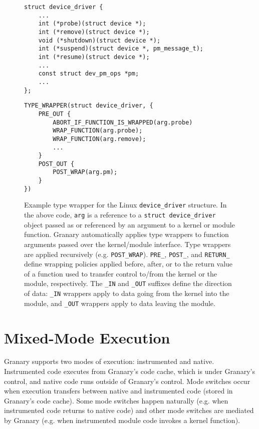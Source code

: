 \documentclass[preprint]{sigplanconf}
\let\ORIGcaption\caption
\begin{document}
\begin{figure*}[t!]
\lstset{language=C, tabsize=2, stepnumber=1}
\begin{multicols}{2}
\begin{lstlisting}[basicstyle=\footnotesize\ttfamily]
struct device_driver {
	...
	int (*probe)(struct device *);
	int (*remove)(struct device *);
	void (*shutdown)(struct device *);
	int (*suspend)(struct device *, pm_message_t);
	int (*resume)(struct device *);
	...
	const struct dev_pm_ops *pm;
	...
};
\end{lstlisting}
\columnbreak
\begin{lstlisting}[basicstyle=\footnotesize\ttfamily]
TYPE_WRAPPER(struct device_driver, {
    PRE_OUT {
        ABORT_IF_FUNCTION_IS_WRAPPED(arg.probe)
        WRAP_FUNCTION(arg.probe);
        WRAP_FUNCTION(arg.remove);
        ...
    }
    POST_OUT {
        POST_WRAP(arg.pm);
    }
})
\end{lstlisting}
\end{multicols}
\ORIGcaption[LoF entry]{Example type wrapper for the Linux \texttt{device\_driver} structure. In the above code, \texttt{arg} is a reference to a \texttt{struct device\_driver} object passed as or referenced by an argument to a kernel or module function. Granary automatically applies type wrappers to function arguments passed over the kernel/module interface. Type wrappers are applied recursively (e.g. \texttt{POST\_WRAP}). \texttt{PRE\_}, \texttt{POST\_}, and \texttt{RETURN\_} define wrapping policies applied before, after, or to the return value of a function used to transfer control to/from the kernel or the module, respectively. The \texttt{\_IN} and \texttt{\_OUT} suffixes define the direction of data: \texttt{\_IN} wrappers apply to data going from the kernel into the module, and \texttt{\_OUT} wrappers apply to data leaving the module.}
\label{fig:type_wrapper}
\end{figure*}

\section{Mixed-Mode Execution}\label{sec:modes}
Granary supports two modes of execution: instrumented and native. Instrumented code executes from Granary's code cache, which is under Granary's control, and native code runs outside of Granary's control. Mode switches occur when execution transfers between native and instrumented code (stored in Granary's code cache). Some mode switches happen naturally (e.g. when instrumented code returns to native code) and other mode switches are mediated by Granary (e.g. when instrumented module code invokes a kernel function).
\end{document}
